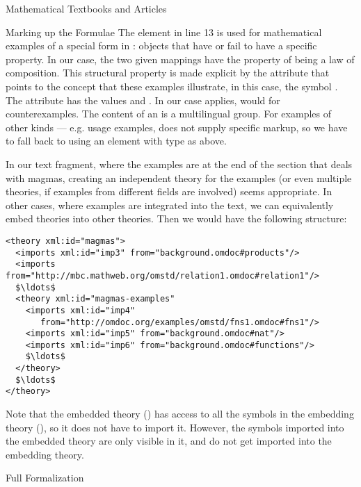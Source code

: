 \begin{tchapter}[id=algebra,short=Textbooks and Articles]{Mathematical Textbooks and Articles}
\begin{tsection}[id=formulae]{Marking up the Formulae}
\noindent The {} element in line 13 is used for
mathematical examples of a special form in {\omdoc}: objects that
have or fail to have a specific property. In our case, the two given
mappings have the property of being a law of composition. This
structural property is made explicit by the
{} attribute that points to the concept that
these examples illustrate, in this case, the symbol
{}. The {}
attribute has the values {} and
{}.  In our case
{} applies,
{} would for counterexamples. The
content of an {} is a multilingual {}
group. For examples of other kinds --- e.g. usage examples, {\omdoc}
does not supply specific markup, so we have to fall back to using an
{} element with type
{} as above.

In our text fragment, where the examples are at the end of the section that deals
with magmas, creating an independent theory for the examples (or even multiple
theories, if examples from different fields are involved) seems appropriate. In
other cases, where examples are integrated into the text, we can equivalently embed
theories into other theories. Then we would have the following structure:

\begin{lstlisting}[label=lst:example-embedded,mathescape,
    caption={Examples embedded into a theory},
    index={theory,imports}]
<theory xml:id="magmas">
  <imports xml:id="imp3" from="background.omdoc#products"/>
  <imports from="http://mbc.mathweb.org/omstd/relation1.omdoc#relation1"/>
  $\ldots$
  <theory xml:id="magmas-examples"
    <imports xml:id="imp4" 
       from="http://omdoc.org/examples/omstd/fns1.omdoc#fns1"/>
    <imports xml:id="imp5" from="background.omdoc#nat"/>
    <imports xml:id="imp6" from="background.omdoc#functions"/>
    $\ldots$
  </theory>
  $\ldots$
</theory>
\end{lstlisting}
Note that the embedded theory ({}) has access to all the
symbols in the embedding theory ({}), so it does not have to import it.
However, the symbols imported into the embedded theory are only visible in it, and do
not get imported into the embedding theory.
\end{tsection}

\begin{tsection}[id=formalization]{Full Formalization}
      

\end{tsection}
\end{tchapter}
